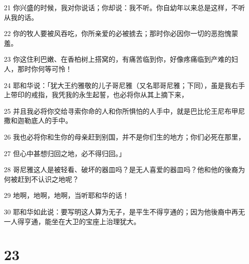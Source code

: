 \par 21 你兴盛的时候，我对你说话；你却说：我不听。你自幼年以来总是这样，不听从我的话。
\par 22 你的牧人要被风吞吃，你所亲爱的必被掳去；那时你必因你一切的恶抱愧蒙羞。
\par 23 你这住利巴嫩、在香柏树上搭窝的，有痛苦临到你，好像疼痛临到产难的妇人，那时你何等可怜！
\par 24 耶和华说：「犹大王约雅敬的儿子哥尼雅（又名耶哥尼雅；下同），虽是我右手上带印的戒指，我凭我的永生起誓，也必将你从其上摘下来，
\par 25 并且我必将你交给寻索你命的人和你所惧怕的人手中，就是巴比伦王尼布甲尼撒和迦勒底人的手中。
\par 26 我也必将你和生你的母亲赶到别国，并不是你们生的地方；你们必死在那里，
\par 27 但心中甚想归回之地，必不得归回。」
\par 28 哥尼雅这人是被轻看、破坏的器皿吗？是无人喜爱的器皿吗？他和他的後裔为何被赶到不认识之地呢？
\par 29 地啊，地啊，地啊，当听耶和华的话！
\par 30 耶和华如此说：要写明这人算为无子，是平生不得亨通的；因为他後裔中再无一人得亨通，能坐在大卫的宝座上治理犹大。

\chapter{23}

